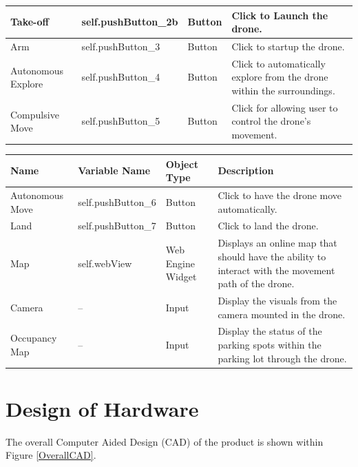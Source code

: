 \documentclass[12pt, titlepage]{article}
\begin{document}
\begin{table}[!h]
\begin{center}
\begin{tabular}{ | m{2.5cm} | m{3.5cm} | m{2.5cm} | m{6.5cm} | }
\hline
Take-off & self.pushButton_2b & Button & Click to Launch the drone. \\
\hline
Arm & self.pushButton_3 & Button & Click to startup the drone. \\
\hline
Autonomous Explore & self.pushButton_4 & Button & Click to automatically explore from the drone within the surroundings. \\
\hline
Compulsive Move & self.pushButton_5 & Button & Click for allowing user to control the  drone’s movement. \\
\hline
\end{tabular}
\end{center}
\end{table}

\begin{table}[!h]
\begin{center}
\begin{tabular}{ | m{2.5cm} | m{3.5cm} | m{2.5cm} | m{6.5cm} | } 
\hline
Name & Variable Name & Object Type & Description \\
\hline
Autonomous Move & self.pushButton_6 & Button & Click to have the drone move automatically. \\
\hline
Land & self.pushButton_7 & Button & Click to land the drone. \\
\hline
Map & self.webView & Web Engine Widget & Displays an online map that should have the ability to interact with the movement path of the drone. \\
\hline
Camera & -- & Input & Display the visuals from the camera mounted in the drone. \\
\hline
Occupancy Map & -- & Input & Display the status of the parking spots within the parking lot through the drone. \\
\hline
\end{tabular}
\end{center}
\end{table}

\clearpage

\section{Design of Hardware}
\label{sec:mechHardware}

The overall Computer Aided Design (CAD) of the product is shown within Figure \ref{OverallCAD}. 
\end{document}
